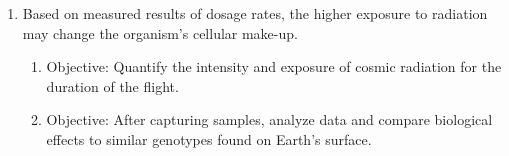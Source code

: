 \begin{enumerate}
\item Based on measured results of dosage rates, the higher exposure to radiation may change the organism's cellular make-up.
	\begin{enumerate}
	\item Objective: Quantify the intensity and exposure of cosmic radiation for the duration of the flight.
	\item Objective: After capturing samples, analyze data and compare biological effects to similar genotypes found on Earth's surface.
	\end{enumerate}
\end{enumerate}

\vspace*{-0.5cm}
